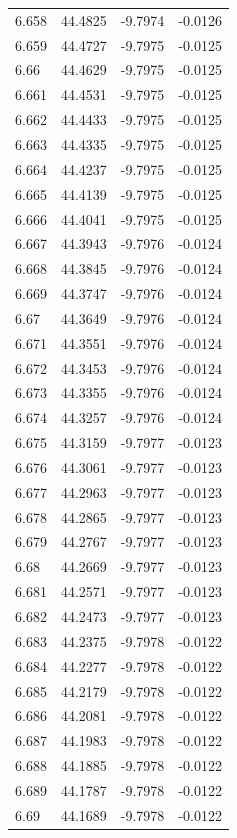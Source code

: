 \begin{tabular}{llll}
6.658 & 44.4825 & -9.7974 & -0.0126 \\
6.659 & 44.4727 & -9.7975 & -0.0125 \\
6.66 & 44.4629 & -9.7975 & -0.0125 \\
6.661 & 44.4531 & -9.7975 & -0.0125 \\
6.662 & 44.4433 & -9.7975 & -0.0125 \\
6.663 & 44.4335 & -9.7975 & -0.0125 \\
6.664 & 44.4237 & -9.7975 & -0.0125 \\
6.665 & 44.4139 & -9.7975 & -0.0125 \\
6.666 & 44.4041 & -9.7975 & -0.0125 \\
6.667 & 44.3943 & -9.7976 & -0.0124 \\
6.668 & 44.3845 & -9.7976 & -0.0124 \\
6.669 & 44.3747 & -9.7976 & -0.0124 \\
6.67 & 44.3649 & -9.7976 & -0.0124 \\
6.671 & 44.3551 & -9.7976 & -0.0124 \\
6.672 & 44.3453 & -9.7976 & -0.0124 \\
6.673 & 44.3355 & -9.7976 & -0.0124 \\
6.674 & 44.3257 & -9.7976 & -0.0124 \\
6.675 & 44.3159 & -9.7977 & -0.0123 \\
6.676 & 44.3061 & -9.7977 & -0.0123 \\
6.677 & 44.2963 & -9.7977 & -0.0123 \\
6.678 & 44.2865 & -9.7977 & -0.0123 \\
6.679 & 44.2767 & -9.7977 & -0.0123 \\
6.68 & 44.2669 & -9.7977 & -0.0123 \\
6.681 & 44.2571 & -9.7977 & -0.0123 \\
6.682 & 44.2473 & -9.7977 & -0.0123 \\
6.683 & 44.2375 & -9.7978 & -0.0122 \\
6.684 & 44.2277 & -9.7978 & -0.0122 \\
6.685 & 44.2179 & -9.7978 & -0.0122 \\
6.686 & 44.2081 & -9.7978 & -0.0122 \\
6.687 & 44.1983 & -9.7978 & -0.0122 \\
6.688 & 44.1885 & -9.7978 & -0.0122 \\
6.689 & 44.1787 & -9.7978 & -0.0122 \\
6.69 & 44.1689 & -9.7978 & -0.0122 \\

\end{tabular}
